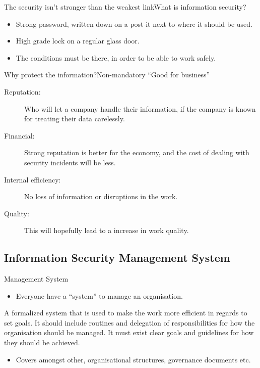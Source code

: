 \documentclass{beamer}
\begin{document}
\begin{frame}{The security isn't stronger than the weakest link}{What is information security?}
  \begin{itemize}
    \item Strong password, written down on a post-it next to where it should be
      used.
    \item High grade lock on a regular glass door.
    \item The conditions must be there, in order to be able to work safely.
  \end{itemize}
\end{frame}

\begin{frame}{Why protect the information?}{Non-mandatory}
  \enquote{Good for business}
  \begin{description}
    \item[Reputation:] Who will let a company handle their information, if the
      company is known for treating their data carelessly.
    \item[Financial:] Strong reputation is better for the economy, and the cost
      of dealing with security incidents will be less.
    \item[Internal efficiency:] No loss of information or disruptions in the
      work.
    \item[Quality:] This will hopefully lead to a increase in work quality.
  \end{description}
\end{frame}

\subsection{Information Security Management System}
\begin{frame}{Management System}
  \begin{itemize}
    \item Everyone have a \enquote{system} to manage an organisation.
  \end{itemize}
      A formalized system that is used to make the work more efficient in
      regards to set goals. It should include routines and delegation of
      responsibilities for how the organisation should be managed. It must exist
      clear goals and guidelines for how they should be achieved.
  \begin{itemize}
    \item Covers amongst other, organisational structures, governance documents
      etc.
  \end{itemize}
\end{frame}
\end{document}
